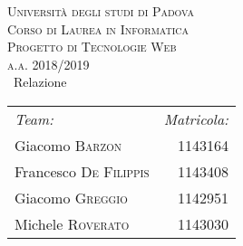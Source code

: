 \begin{titlepage} %
	\begin{center} %

		
		\textsc{\LARGE Università degli studi di Padova}\\[1.5cm]
		
		\textsc{\Large Corso di Laurea in Informatica}\\[0.5cm]
		
		\textsc{\Large Progetto di Tecnologie Web}\\[0.5cm]
		

		
		\textsc{\large a.a. 2018/2019}\\[0.5cm] %
		
		
		{\huge\ Relazione}\\[0.4cm] %
		
		
	 	\large
			\begin{tabular}{l r}
				\emph{Team:} & \emph{Matricola:} \\
				Giacomo \textsc{Barzon} & 1143164 \\
				Francesco \textsc{De Filippis} & 1143408 \\
				Giacomo \textsc{Greggio} & 1142951 \\
				Michele \textsc{Roverato} & 1143030 \\
			\end{tabular}
	\end{center}
\end{titlepage}
